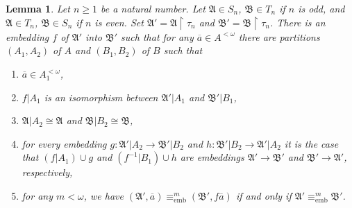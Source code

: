 \documentclass{ndjflart}
\theoremstyle{plain}
\newtheorem{lemma}[conjecture]{Lemma}
\theoremstyle{definition}
\numberwithin{equation}{section}
\DeclareMathOperator{\emb}{emb}
\begin{document}
\begin{lemma}\label{natural_number}
Let $n \geq 1$ be a natural number. 
Let $\mathfrak{A} \in S_n$, $\mathfrak{B}\in T_n$ if $n$ is odd, and
$\mathfrak{A}\in T_n$, $\mathfrak{B} \in S_n$ if $n$ is even.
Set $\mathfrak{A}' = \mathfrak{A}\upharpoonright \tau_n$ and $\mathfrak{B}' = \mathfrak{B}\upharpoonright \tau_n$.
There is an embedding $f$ of $\mathfrak{A}'$ into $\mathfrak{B}'$ such that for any $\overline{a} \in A^{<\omega}$ there are partitions $(A_1,A_2)$ of $A$ and $(B_1,B_2)$ of $B$ such that
\begin{enumerate}
\item $\overline{a} \in A_1^{<\omega}$,
\item $f | A_1$ is an isomorphism between $\mathfrak{A}' | A_1$ and $\mathfrak{B}' | B_1$,
\item $\mathfrak{A} | A_2 \cong \mathfrak{A}$ and $\mathfrak{B}|B_2 \cong \mathfrak{B}$,
\item for every embedding $g \colon \mathfrak{A}'|A_2\rightarrow \mathfrak{B}'|B_2$ and $h \colon \mathfrak{B}' |B_2\rightarrow \mathfrak{A}'|A_2$ it is the case that $(f|A_1) \cup g$ and $(f^{-1}|B_1) \cup h$ are embeddings $\mathfrak{A}'\rightarrow\mathfrak{B}'$ and $\mathfrak{B}'\rightarrow\mathfrak{A}'$, respectively,
\item for any $m < \omega$, we have $(\mathfrak{A}',\overline{a}) \equiv^m_{\emb} (\mathfrak{B}',f\overline{a})$ if and only if $\mathfrak{A}' \equiv^m_{\emb} \mathfrak{B}'$.
\end{enumerate}
\end{lemma}
\end{document}
